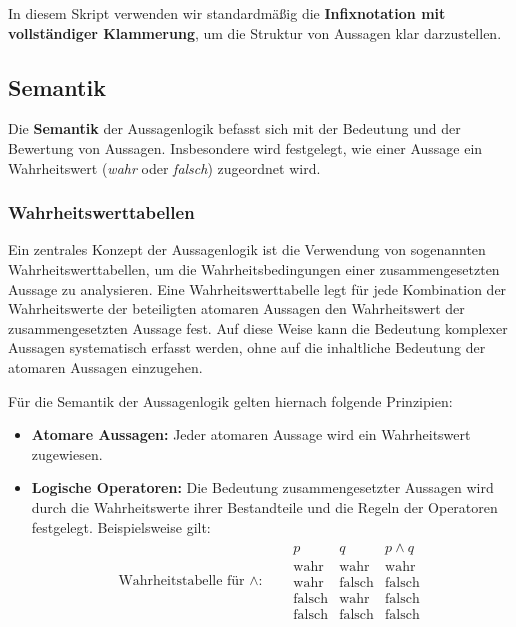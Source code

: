 \documentclass[main.tex]{subfiles}
\begin{document}
In diesem Skript verwenden wir standardmäßig die \textbf{Infixnotation mit vollständiger Klammerung}, um die Struktur von Aussagen klar darzustellen.

\subsection{Semantik}

Die \textbf{Semantik} der Aussagenlogik befasst sich mit der Bedeutung und der Bewertung von Aussagen. Insbesondere wird festgelegt, wie einer Aussage ein Wahrheitswert (\textit{wahr} oder \textit{falsch}) zugeordnet wird.

\subsubsection{Wahrheitswerttabellen}

Ein zentrales Konzept der Aussagenlogik ist die Verwendung von sogenannten Wahrheitswerttabellen, um die Wahrheitsbedingungen einer zusammengesetzten Aussage zu analysieren. Eine Wahrheitswerttabelle legt für jede Kombination der Wahrheitswerte der beteiligten atomaren Aussagen den Wahrheitswert der zusammengesetzten Aussage fest. Auf diese Weise kann die Bedeutung komplexer Aussagen systematisch erfasst werden, ohne auf die inhaltliche Bedeutung der atomaren Aussagen einzugehen.

Für die Semantik der Aussagenlogik gelten hiernach folgende Prinzipien:
\begin{itemize}
    \item \textbf{Atomare Aussagen:} Jeder atomaren Aussage wird ein Wahrheitswert zugewiesen.
    \item \textbf{Logische Operatoren:} Die Bedeutung zusammengesetzter Aussagen wird durch die Wahrheitswerte ihrer Bestandteile und die Regeln der Operatoren festgelegt. Beispielsweise gilt:
    \begin{align*}
        \text{Wahrheitstabelle für \(\land\):} & \quad 
        \begin{array}{c|c|c}
            p & q & p \land q \\
            \hline
            \text{wahr} & \text{wahr} & \text{wahr} \\
            \text{wahr} & \text{falsch} & \text{falsch} \\
            \text{falsch} & \text{wahr} & \text{falsch} \\
            \text{falsch} & \text{falsch} & \text{falsch}
        \end{array}
    \end{align*}
\end{itemize}
\end{document}
